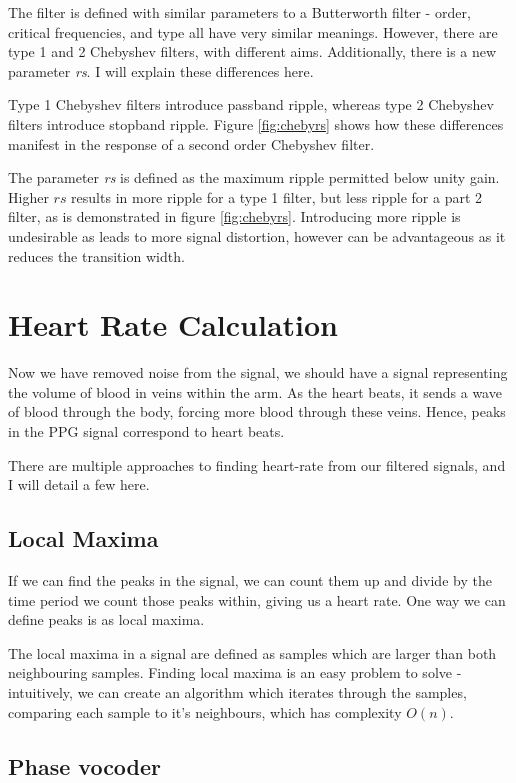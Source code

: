 \documentclass[12pt,a4paper,twoside,openright]{report}
\begin{document}
The filter is defined with similar parameters to a Butterworth filter - order,
critical frequencies, and type all have very similar meanings. However,
there are type 1 and 2 Chebyshev filters, with different aims. Additionally,
there is a new parameter \emph{rs}. I will explain these differences here.

Type 1 Chebyshev filters introduce passband ripple, whereas type 2 Chebyshev 
filters introduce stopband ripple. Figure \ref{fig:chebyrs} shows how these
differences manifest in the response of a second order Chebyshev filter.

The parameter \emph{rs} is defined as the maximum ripple permitted below unity
gain. Higher \(rs\) results in more ripple for a type 1 filter, but less
ripple for a part 2 filter, as is demonstrated in figure \ref{fig:chebyrs}.
Introducing more ripple is undesirable as leads to more signal distortion,
however can be advantageous as it reduces the transition width.

\section{Heart Rate Calculation}

Now we have removed noise from the signal, we should have a signal 
representing the volume of blood in veins within the arm. As the heart beats,
it sends a wave of blood through the body, forcing more blood through these
veins. Hence, peaks in the PPG signal correspond to heart beats. 

There are multiple approaches to finding heart-rate from our filtered
signals, and I will detail a few here.

\subsection{Local Maxima}

If we can find the peaks in the signal, we can count them up and divide by the
time period we count those peaks within, giving us a heart rate. One way we
can define peaks is as local maxima.

The local maxima in a signal are defined as samples which are larger than both
neighbouring samples. Finding local maxima is an easy problem to solve - 
intuitively, we can create an algorithm which iterates through the samples,
comparing each sample to it's neighbours, which has complexity \(O(n)\).

\subsection{Phase vocoder}
\end{document}
